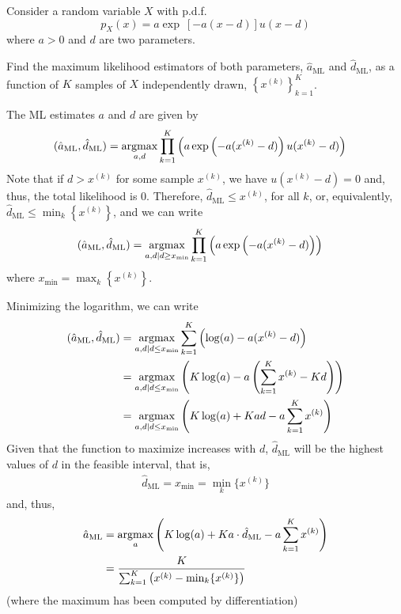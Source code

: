 \else

\question Consider a random variable $X$ with p.d.f.
$$p_X(x) = a\exp\ [-a(x-d) ]u(x-d)$$
where $a>0$ and $d$ are two parameters.

Find the maximum likelihood estimators of both parameters, $\hat{a}_\text{ML}$ and $\hat{d}_\text{ML}$, as a function of $K$ samples of $X$ independently drawn, $\left\{x^{(k)}\right\}^{K}_{k=1}$.

\begin{solution}
The ML estimates $a$ and $d$ are given by
\begin{align*}
(\hat{a}_\text{ML}, \hat{d}_\text{ML}) 
	&= \operatorname*{argmax}_{a, d} \prod_{k=1}^{K} \left(a\exp\left(-a(x^{(k)}-d) \right)u(x^{(k)} - d)\right)
\end{align*}
Note that if $d > x^{(k)}$ for some sample $x^{(k)}$, we have $u(x^{(k)} - d)=0$ and, thus, the total likelihood is 0. Therefore, $\hat{d}_\text{ML} \le x^{(k)}$, for all $k$, or, equivalently, $\hat{d}_\text{ML} \le \min_k \left\{x^{(k)}\right\}$, and we can write
\begin{align*}
(\hat{a}_\text{ML}, \hat{d}_\text{ML}) 
	&= \operatorname*{argmax}_{a, d \mid d \ge x_{\min} } 
	       \prod_{k=1}^{K} \left(a\exp\left(-a(x^{(k)}-d) \right)\right)
\end{align*}
where $x_{\min} = \max_k \left\{x^{(k)}\right\}$. 

Minimizing the logarithm, we can write
\begin{align*}
(\hat{a}_\text{ML}, \hat{d}_\text{ML}) 
	&= \operatorname*{argmax}_{a, d \mid d \le x_{\min}}
	       \sum_{k=1}^{K} \left(\log(a) -a (x^{(k)}-d) \right) \\
	&= \operatorname*{argmax}_{a, d \mid d \le x_{\min}} 
	       \left(K\log(a) -a \left(\sum_{k=1}^{K} x^{(k)}- Kd\right) \right) \\
	&= \operatorname*{argmax}_{a, d \mid d \le x_{\min}} 
	       \left(K\log(a) + Kad - a \sum_{k=1}^{K} x^{(k)} \right)
\end{align*}
Given that the function to maximize increases with $d$, $\hat{d}_\text{ML}$ will be the highest values of $d$ in the feasible interval, that is,
\begin{align*}
\hat{d}_\text{ML} = x_{\min} = \min_{k}\{x^{(k)}\}
\end{align*}
and, thus,
\begin{align*}
\hat{a}_\text{ML} 
	&= \operatorname*{argmax}_{a} \left(K\log(a) + Ka\cdot \hat{d}_\text{ML} - a \sum_{k=1}^{K} x^{(k)} \right) \\
	&= \frac{K}{\sum^{K}_{k=1} \left(x^{(k)}-\min_k\{x^{(k)}\} \right)}	
\end{align*}
(where the maximum has been computed by differentiation)
\end{solution}

\fi